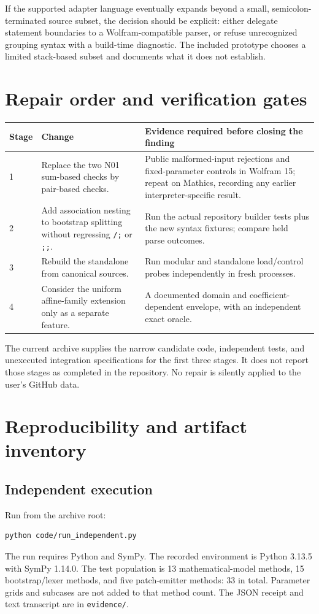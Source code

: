\documentclass[11pt,letterpaper]{article}
\newcommand{\code}[1]{\nolinkurl{#1}}
\begin{document}
If the supported adapter language eventually expands beyond a small, semicolon-terminated source subset, the decision should be explicit: either delegate statement boundaries to a Wolfram-compatible parser, or refuse unrecognized grouping syntax with a build-time diagnostic. The included prototype chooses a limited stack-based subset and documents what it does not establish.

\section{Repair order and verification gates}

\begin{tabularx}{\linewidth}{@{}lYY@{}}
\toprule
Stage & Change & Evidence required before closing the finding\\
 & Replace the two N01 sum-based checks by pair-based checks. & Public malformed-input rejections and fixed-parameter controls in Wolfram 15; repeat on Mathics, recording any earlier interpreter-specific result.\\
2 & Add association nesting to bootstrap splitting without regressing \code{/;} or \code{;;}. & Run the actual repository builder tests plus the new syntax fixtures; compare held parse outcomes.\\
3 & Rebuild the standalone from canonical sources. & Run modular and standalone load/control probes independently in fresh processes.\\
4 & Consider the uniform affine-family extension only as a separate feature. & A documented domain and coefficient-dependent envelope, with an independent exact oracle.\\
\bottomrule
\end{tabularx}

The current archive supplies the narrow candidate code, independent tests, and unexecuted integration specifications for the first three stages. It does not report those stages as completed in the repository. No repair is silently applied to the user's GitHub data.

\section{Reproducibility and artifact inventory}
\label{sec:reproduce}

\subsection{Independent execution}
Run from the archive root:
\begin{lstlisting}
python code/run_independent.py
\end{lstlisting}
The run requires Python and SymPy. The recorded environment is Python 3.13.5 with SymPy 1.14.0. The test population is 13 mathematical-model methods, 15 bootstrap/lexer methods, and five patch-emitter methods: 33 in total. Parameter grids and subcases are not added to that method count. The JSON receipt and text transcript are in \code{evidence/}.
\end{document}
